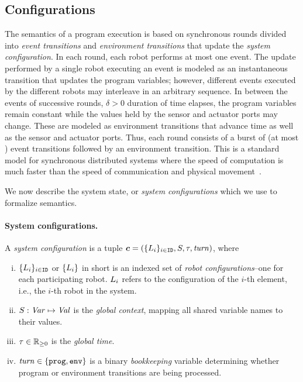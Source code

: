 \subsection{Configurations}
\label{sec:configs}

The semantics of a \lgname program execution is based on synchronous rounds divided into \emph{event transitions} and \emph{environment transitions} that update the \emph{system configuration}.
In each round, each robot performs at most one event.
The update performed by a single robot executing an event is modeled as an instantaneous transition that updates the program variables; however, different events executed by the different robots may interleave in an arbitrary sequence.
In between the events of successive rounds, $\delta>0$ duration of time elapses, the program variables remain constant while the values held by the sensor and actuator ports may change.
These are modeled as environment transitions that advance time as well as the sensor and actuator ports.
%
Thus, each round consists of a burst of (at most \NMAX) event transitions followed by an environment transition. This is a standard model for synchronous distributed systems where the speed of computation is much faster than the speed of communication and physical movement~\cite{lynch1996a,attiyawelch}.

We now describe the system state, or \emph{system configurations} which we use to formalize \lgname semantics.

\paragraph{System configurations.}

A \emph{system configuration} is a tuple $\mathit{\boldsymbol{c}} = (\{L_{i}\}_{i\in\texttt{ID}},{S},\tau,\mathit{turn})$, where

\begin{enumerate}[(i)]
\item $\{L_{i}\}_{i\in\texttt{ID}}$ or $\{L_{i}\}$ in short is an indexed set of \emph{robot configurations}--one for each participating robot.
      $L_{i}$ refers to the configuration of the $i$-th element, i.e., the $i$-th robot in the system.
\item ${S} : \mathit{Var} \mapsto \mathit{Val}$ is the {\em global context\/}, mapping all shared variable names to their values.
\item $\tau\in \nnreals$ is the {\em global time\/}.
\item $\mathit{turn}\in\{\mathtt{prog},\mathtt{env}\}$ is a binary \emph{bookkeeping} variable determining whether program or environment transitions are being processed.
\end{enumerate}

